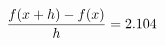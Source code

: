 \documentclass[preview]{standalone}
\begin{document}
\begin{align*}
\special{dvisvgm:raw <g id='unique000'>}\frac{f(x+h)-f(x)}{h} = 2.104\special{dvisvgm:raw </g>}
\end{align*}
\end{document}
